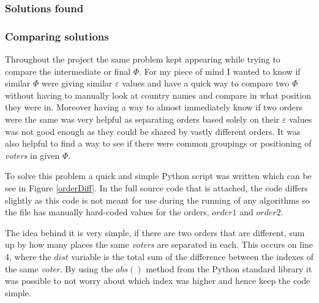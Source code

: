 \documentclass[12pt]{report}
\begin{document}




\subsubsection{Solutions found}


\subsubsection{Comparing solutions}
Throughout the project the same problem kept appearing while trying to compare the intermediate or final $\Phi$. For my piece of mind I wanted to know if similar $\Phi$ were giving similar $\varepsilon$ values and have a quick way to compare two $\Phi$ without having to manually look at country names and compare in what position they were in. Moreover having a way to almost immediately know if two orders were the same was very helpful as separating orders based solely on their $\varepsilon$ values was not good enough as they could be shared by vastly different orders. It was also helpful to find a way to see if there were common groupings or positioning of \textit{voters} in given $\Phi$.

To solve this problem a quick and simple Python script was written which can be see in Figure \ref{orderDiff}. In the full source code that is attached, the code differs slightly as this code is not meant for use during the running of any algorithms so the file has manually hard-coded values for the orders, $order1$ and $order2$.

The idea behind it is very simple, if there are two orders that are different, sum up by how many places the same \textit{voters} are separated in each. This occurs on line 4, where the $dist$ variable is the total sum of the difference between the indexes of the same \textit{voter}. By using the $abs()$ method from the Python standard library it was possible to not worry about which index was higher and hence keep the code simple.
\end{document}
